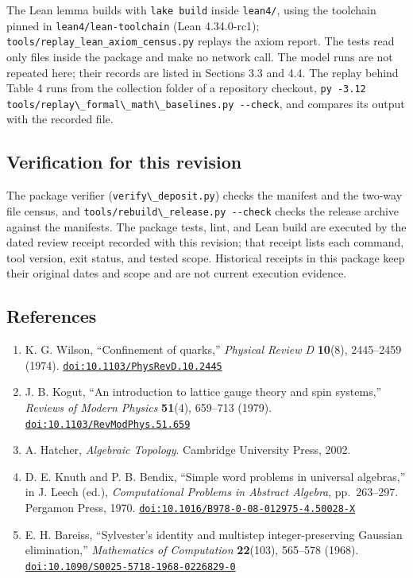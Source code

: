 \documentclass[
  11pt,
]{article}
\newcommand{\passthrough}[1]{#1}
\providecommand{\tightlist}{%
  \setlength{\itemsep}{0pt}\setlength{\parskip}{0pt}}
\begin{document}
The Lean lemma builds with \passthrough{\lstinline!lake build!} inside
\passthrough{\lstinline!lean4/!}, using the toolchain pinned in
\passthrough{\lstinline!lean4/lean-toolchain!} (Lean 4.34.0-rc1);
\nolinkurl{tools/replay_lean_axiom_census.py} replays the axiom report.
The tests read only files inside the package and make no network call.
The model runs are not repeated here; their records are listed in
Sections 3.3 and 4.4. The replay behind Table 4 runs from the collection
folder of a repository checkout,
\passthrough{\lstinline!py -3.12 tools/replay\_formal\_math\_baselines.py --check!},
and compares its output with the recorded file.

\subsection{Verification for this
revision}\label{verification-for-this-revision}

The package verifier (\passthrough{\lstinline!verify\_deposit.py!})
checks the manifest and the two-way file census, and
\passthrough{\lstinline!tools/rebuild\_release.py --check!} checks the
release archive against the manifests. The package tests, lint, and Lean
build are executed by the dated review receipt recorded with this
revision; that receipt lists each command, tool version, exit status,
and tested scope. Historical receipts in this package keep their
original dates and scope and are not current execution evidence.

\subsection{References}\label{references}

\begin{enumerate}
\def\labelenumi{\arabic{enumi}.}
\tightlist
\item
  K. G. Wilson, ``Confinement of quarks,'' \emph{Physical Review D}
  \textbf{10}(8), 2445--2459 (1974).
  \href{https://doi.org/10.1103/PhysRevD.10.2445}{\nolinkurl{doi:10.1103/PhysRevD.10.2445}}
\item
  J. B. Kogut, ``An introduction to lattice gauge theory and spin
  systems,'' \emph{Reviews of Modern Physics} \textbf{51}(4), 659--713
  (1979).
  \href{https://doi.org/10.1103/RevModPhys.51.659}{\nolinkurl{doi:10.1103/RevModPhys.51.659}}
\item
  A. Hatcher, \emph{Algebraic Topology}. Cambridge University Press,
  2002.
\item
  D. E. Knuth and P. B. Bendix, ``Simple word problems in universal
  algebras,'' in J. Leech (ed.), \emph{Computational Problems in
  Abstract Algebra}, pp.~263--297. Pergamon Press, 1970.
  \href{https://doi.org/10.1016/B978-0-08-012975-4.50028-X}{\nolinkurl{doi:10.1016/B978-0-08-012975-4.50028-X}}
\item
  E. H. Bareiss, ``Sylvester's identity and multistep integer-preserving
  Gaussian elimination,'' \emph{Mathematics of Computation}
  \textbf{22}(103), 565--578 (1968).
  \href{https://doi.org/10.1090/S0025-5718-1968-0226829-0}{\nolinkurl{doi:10.1090/S0025-5718-1968-0226829-0}}
\end{enumerate}
\end{document}
